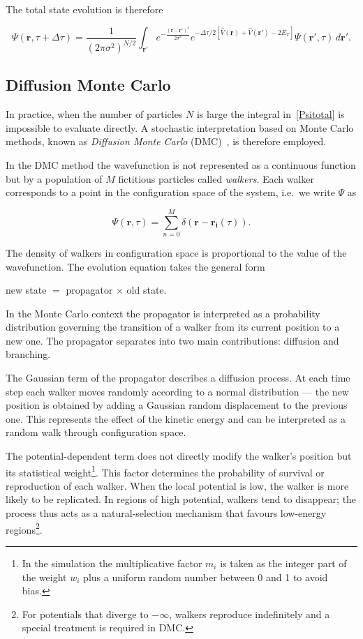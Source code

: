 \documentclass[11pt,a4paper,twoside,pdf]{article}
\numberwithin{equation}{section}
\begin{document}
The total state evolution is therefore

\begin{equation}
    \Psi(\mathbf{r}, \tau + \Delta \tau) = \frac{1}{(2\pi \sigma^2)^{N/2}} \int_{\mathbf{r'}} e^{-\frac{(\mathbf{r} - \mathbf{r'})^2}{2\sigma^2}} e^{-\Delta \tau /2 \left[ \hat{V}(\mathbf{r}) +  \hat{V}(\mathbf{r'}) - 2E_T \right] } \Psi (\mathbf{r'}, \tau) \,d \mathbf{r'}.
\label{Psitotal}
\end{equation}


\subsection{Diffusion Monte Carlo}
\label{DMC}

In practice, when the number of particles $N$ is large the integral in~\ref{Psitotal}
is impossible to evaluate directly. A stochastic interpretation based on Monte Carlo
methods, known as \textit{Diffusion Monte Carlo} (DMC)~\cite{hammond1994monte}, is
therefore employed.

In the DMC method the wavefunction is not represented as a continuous function
but by a population of $M$ fictitious particles called \textit{walkers}. Each walker
corresponds to a point in the configuration space of the system, i.e.\ we write $\Psi$ as

$$
    \Psi(\mathbf{r}, \tau) = \sum_{n=0}^M \delta(\mathbf{r} - \mathbf{r_i}(\tau)).
$$

The density of walkers in configuration space is proportional to the value of the
wavefunction. The evolution equation takes the general form

\begin{center}
new state $=$ propagator $\times$ old state.
\end{center}

In the Monte Carlo context the propagator is interpreted as a probability distribution
governing the transition of a walker from its current position to a new one. The
propagator separates into two main contributions: diffusion and branching.

The Gaussian term of the propagator describes a diffusion process. At each time
step each walker moves randomly according to a normal distribution — the new
position is obtained by adding a Gaussian random displacement to the previous one.
This represents the effect of the kinetic energy and can be interpreted as a random
walk through configuration space.

The potential-dependent term does not directly modify the walker's position
but its statistical weight\footnote{In the simulation the multiplicative factor $m_i$
is taken as the integer part of the weight $w_i$ plus a uniform random number between
0 and 1 to avoid bias.}. This factor determines the probability of survival or
reproduction of each walker. When the local potential is low, the walker is more
likely to be replicated. In regions of high potential, walkers tend to disappear;
the process thus acts as a natural-selection mechanism that favours low-energy
regions\footnote{For potentials that diverge to $-\infty$, walkers reproduce
indefinitely and a special treatment is required in DMC.}.
\end{document}
